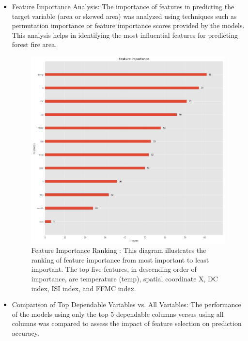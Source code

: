 \begin{itemize}
\item Feature Importance Analysis:
The importance of features in predicting the target variable (area or skewed area) was analyzed using techniques such as permutation importance or feature importance scores provided by the models. This analysis helps in identifying the most influential features for predicting forest fire area.


\begin{figure}[ht]
    \centering
    \includegraphics[scale=0.4]{figures/Feature Ranking.jpg}
    \caption{Feature Importance Ranking : This diagram illustrates the ranking of feature importance from most important to least important. The top five features, in descending order of importance, are temperature (temp), spatial coordinate X, DC index, ISI index, and FFMC index.}
\end{figure}

\item Comparison of Top Dependable Variables vs. All Variables:
The performance of the models using only the top 5 dependable columns versus using all columns was compared to assess the impact of feature selection on prediction accuracy.
\end{itemize}

